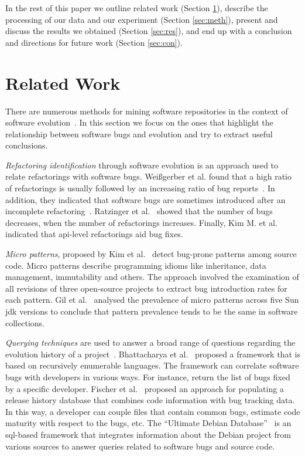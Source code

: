 \documentclass{sig-alternate}
\begin{document}
In the rest of this paper we
outline related work (Section \ref{sec:rel}),
describe the processing of our data and our experiment (Section \ref{sec:meth}),
present and discuss the results we obtained (Section \ref{sec:res}),
and end up with a conclusion and directions for future work (Section \ref{sec:con}).

\section{Related Work}
\label{sec:rel}

There are numerous methods for mining software repositories in the context
of software evolution~\cite{KCM07}. In this section we focus on the ones
that highlight the relationship between software bugs and evolution and try to
extract useful conclusions. 

{\it Refactoring identification} through software evolution is an approach used to
relate refactorings with software bugs. Wei{\ss}gerber et al. found that a high
ratio of refactorings is usually followed by an increasing ratio of bug
reports~\cite{WD06}. In addition, they indicated that software bugs are sometimes introduced
after an incomplete refactoring~\cite{GW05}.
Ratzinger et al.~\cite{RSG08} showed that the number of bugs decreases, when the number of
refactorings increases. Finally, Kim M. et al.~\cite{KCK11} indicated that {\sc api}-level
refactorings aid bug fixes.

{\it Micro patterns}, proposed by Kim et al.~\cite{KPW06}
detect bug-prone patterns among source code. Micro patterns describe programming
idioms like inheritance, data management, immutability and others. The approach
involved the examination of all revisions of three open-source projects to extract bug
introduction rates for each pattern. Gil et al.~\cite{GM05} analysed the
prevalence of micro patterns across five Sun {\sc jdk} versions to conclude that
pattern prevalence tends to be the same in software collections.

{\it Querying techniques} are used to answer a broad range of questions
regarding the evolution history of a project~\cite{HG05}. Bhattacharya et
al.~\cite{BN11,B11} proposed a framework that is based on
recursively enumerable languages. The framework can correlate software
bugs with developers in various ways. For instance, return the list of
bugs fixed by a specific developer. Fischer et al.~\cite{FPG03} proposed
an approach for populating a release history database that combines code
information with bug tracking data. In this way, a developer can couple files
that contain common bugs, estimate code maturity with respect to the bugs,
etc. The ``Ultimate Debian Database''~\cite{NZ10} is an {\sc sql}-based
framework that integrates information about the Debian project from various
sources to answer queries related to software bugs and source code.
\end{document}
